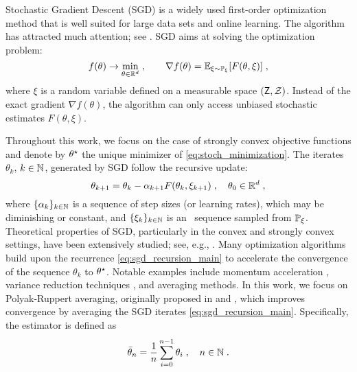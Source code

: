 Stochastic Gradient Descent (SGD) is a widely used first-order optimization method that is well suited for large data sets and online learning. The algorithm has attracted much attention; see \cite{robbins1951stochastic,polyak1992acceleration,nemirovski2009robust,moulines2011non,bubeck2015convex}. SGD aims at solving the optimization problem:
\begin{equation}
\label{eq:stoch_minimization}
f(\theta) \to \min_{\theta \in \mathbb{R}^{d}}\;, \qquad \nabla f(\theta) = \mathbb{E}_{\xi \sim \mathbb{P}_{\xi}}[F(\theta,\xi)] \;, 
\end{equation}
where $\xi$ is a random variable defined on a measurable space $(\mathsf{Z},\mathcal{Z})$. Instead of the exact gradient $\nabla f(\theta)$, the algorithm can only access unbiased stochastic estimates $F(\theta,\xi)$. 
\par 
Throughout this work, we focus on the case of strongly convex objective functions and denote by $\theta^\star$ the unique minimizer of \eqref{eq:stoch_minimization}. The iterates $\theta_k$, $k \in \mathbb{N}$, generated by SGD follow the recursive update:
\begin{equation}
\label{eq:sgd_recursion_main}
\theta_{k+1} = \theta_{k} - \alpha_{k+1} F(\theta_k,\xi_{k+1})\;, \quad \theta_0 \in \mathbb{R}^{d}\;, 
\end{equation}
where $\{\alpha_k\}_{k \in \mathbb{N}}$ is a sequence of step sizes (or learning rates), which may be diminishing or constant, and $\{\xi_k\}_{k \in \mathbb{N}}$ is an \iid\, sequence sampled from $\mathbb{P}_{\xi}$. Theoretical properties of SGD, particularly in the convex and strongly convex settings, have been extensively studied; see, e.g., \cite{nesterov:2004, moulines2011non, bubeck2015convex, lan_2020}. Many optimization algorithms build upon the recurrence \eqref{eq:sgd_recursion_main} to accelerate the convergence of the sequence $\theta_k$ to $\theta^\star$. Notable examples include momentum acceleration \cite{qian1999momentum}, variance reduction techniques \cite{defazio2014saga, schmidt2017minimizing}, and averaging methods. In this work, we focus on Polyak-Ruppert averaging, originally proposed in \cite{ruppert1988efficient} and \cite{polyak1992acceleration}, which improves convergence by averaging the SGD iterates \eqref{eq:sgd_recursion_main}. Specifically, the estimator is defined as  
\begin{equation}
\label{eq:PR_estimate}
\bar \theta_n = \frac{1}{n}\sum_{i=0}^{n-1}\theta_i\;, \quad n \in \mathbb{N}\;.
\end{equation}

